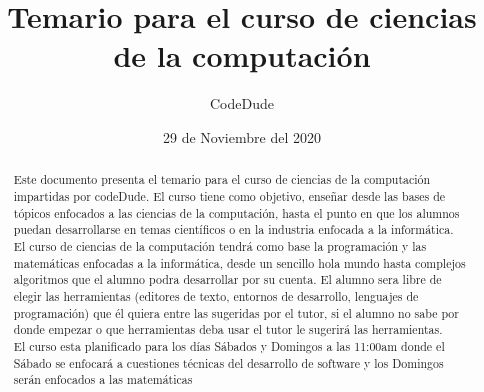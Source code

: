 \documentclass[12pt, letterpaper]{article}
\author{CodeDude}
\title{Temario para el curso de ciencias de la computación}
\date{29 de Noviembre del 2020}
\begin{document}
\maketitle
\newpage
\begin{abstract}
Este documento presenta el temario para el curso de ciencias de la computación impartidas por codeDude. El curso tiene como objetivo, enseñar
desde las bases de tópicos enfocados a las ciencias de la computación, hasta el punto en que los alumnos puedan desarrollarse en temas científicos
o en la industria enfocada a la informática.\\
El curso de ciencias de la computación tendrá como base la programación y las matemáticas enfocadas a la informática, desde un sencillo hola mundo
hasta complejos algoritmos que el alumno podra desarrollar por su cuenta. El alumno sera libre de elegir las herramientas (editores de texto, entornos de
desarrollo, lenguajes de programación) que él quiera entre las sugeridas por el tutor, si el alumno no sabe por donde empezar o que herramientas deba usar
el tutor le sugerirá las herramientas.\\
El curso esta planificado para los días Sábados y Domingos a las 11:00am donde el Sábado se enfocará a cuestiones técnicas del desarrollo de software y los
Domingos serán enfocados a las matemáticas
\end{abstract}
\end{document}
